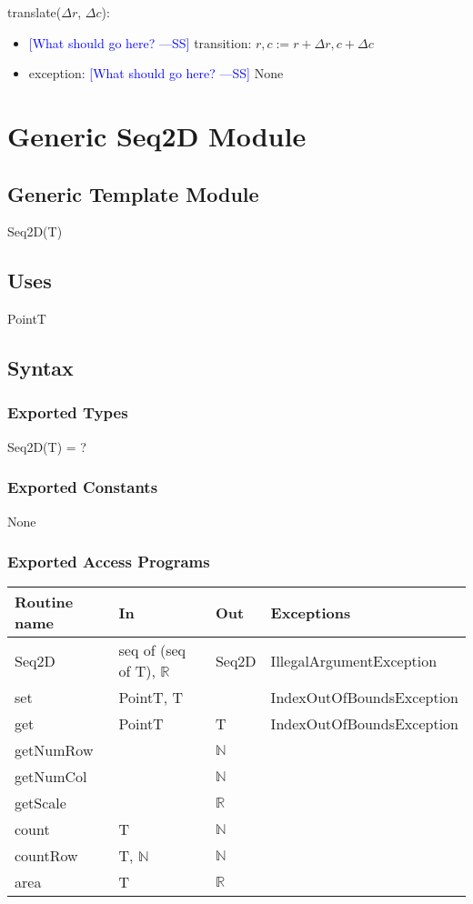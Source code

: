 \documentclass[12pt]{article}
\newcommand{\authornote}[3]{\textcolor{#1}{[#3 ---#2]}}
\newcommand{\authornote}[3]{}
\newcommand{\wss}[1]{\authornote{blue}{SS}{#1}}
\begin{document}
\noindent translate($\Delta r$, $\Delta c$):
\begin{itemize}
\item \wss{What should go here?} transition: $r, c := r + \Delta r, c + \Delta c$
\item exception: \wss{What should go here?} None
\end{itemize}

\newpage

\section* {Generic Seq2D Module}

\subsection* {Generic Template Module}

Seq2D(T)

\subsection* {Uses}

PointT

\subsection* {Syntax}

\subsubsection* {Exported Types}

Seq2D(T) = ?

\subsubsection* {Exported Constants}

None

\subsubsection* {Exported Access Programs}

\begin{tabular}{| l | l | l | p{6cm} |}
\hline
\textbf{Routine name} & \textbf{In} & \textbf{Out} & \textbf{Exceptions}\\
\hline
Seq2D & seq of (seq of T), $\mathbb{R}$ & Seq2D & IllegalArgumentException\\
\hline
set & PointT, T & ~ & IndexOutOfBoundsException\\
\hline
get & PointT & T & IndexOutOfBoundsException\\
\hline
getNumRow & ~ & $\mathbb{N}$ & \\
\hline
getNumCol & ~ & $\mathbb{N}$ & \\
\hline
getScale & ~ & $\mathbb{R}$ & \\
\hline
count & T & $\mathbb{N}$ & \\
\hline
countRow & T, $\mathbb{N}$ & $\mathbb{N}$ & \\
\hline
area & T & $\mathbb{R}$ & \\
\hline
\end{tabular}
\end{document}
